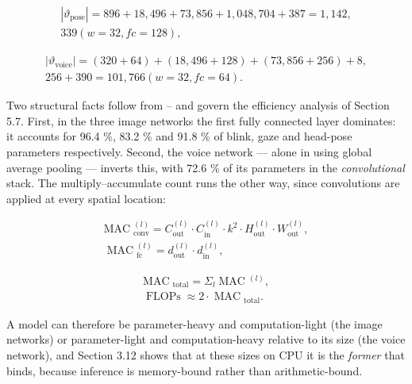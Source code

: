 \begin{equation}
\label{eq:83}
\begin{aligned}
|\vartheta _{\mathrm{pose}}| = 896 + 18, 496 + 73, 856 + 1, 048, 704 + 387 = 1, 142, \\
339 (w = 32, fc = 128),
\end{aligned}
\end{equation}

\begin{equation}
\label{eq:84}
\begin{aligned}
|\vartheta _{\mathrm{voice}}| = (320 + 64) + (18,496 + 128) + (73,856 + 256) + 8, \\
256 + 390 = 101, 766 (w = 32, fc = 64).
\end{aligned}
\end{equation}

Two structural facts follow from -- and govern the efficiency analysis of Section 5.7. First, in the three image networks the first fully connected layer dominates: it accounts for 96.4 \%, 83.2 \% and 91.8 \% of blink, gaze and head-pose parameters respectively. Second, the voice network --- alone in using global average pooling --- inverts this, with 72.6 \% of its parameters in the \emph{convolutional} stack. The multiply--accumulate count runs the other way, since convolutions are applied at every spatial location:

\begin{equation}
\label{eq:85}
\begin{aligned}
\text{MAC}\;_{\mathrm{conv}}^{(l)} = C_{\mathrm{out}}^{(l)} \cdot C_{\mathrm{in}}^{(l)} \cdot k^{2} \cdot H_{\mathrm{out}}^{(l)} \cdot W_{\mathrm{out}}^{(l)}, \\
\;\text{MAC}\;_{\mathrm{fc}}^{(l)} = d_{\mathrm{out}}^{(l)} \cdot d_{\mathrm{in}}^{(l)},
\end{aligned}
\end{equation}

\begin{equation}
\label{eq:86}
\begin{aligned}
\text{MAC}\;_{\mathrm{total}} = \Sigma _l \;\text{MAC}\;^{(l)} , \\
\;\text{FLOPs}\; \approx 2 \cdot \;\text{MAC}\;_{\mathrm{total}} .
\end{aligned}
\end{equation}

A model can therefore be parameter-heavy and computation-light (the image networks) or parameter-light and computation-heavy relative to its size (the voice network), and Section 3.12 shows that at these sizes on CPU it is the \emph{former} that binds, because inference is memory-bound rather than arithmetic-bound.

